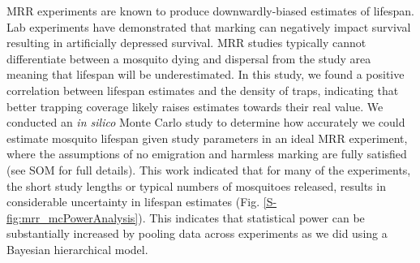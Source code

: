 \documentclass[]{article}
\begin{document}
MRR experiments are known to produce downwardly-biased estimates of
lifespan. Lab experiments have demonstrated that marking can negatively
impact survival \citep{verhulst2013advances,dickens2014effects}
resulting in artificially depressed survival. MRR studies typically
cannot differentiate between a mosquito dying and dispersal from the
study area meaning that lifespan will be underestimated. In this study,
we found a positive correlation between lifespan estimates and the
density of traps, indicating that better trapping coverage likely raises
estimates towards their real value. We conducted an \emph{in silico}
Monte Carlo study to determine how accurately we could estimate mosquito
lifespan given study parameters in an ideal MRR experiment, where the
assumptions of no emigration and harmless marking are fully satisfied
(see SOM for full details). This work indicated that for many of the
experiments, the short study lengths or typical numbers of mosquitoes
released, results in considerable uncertainty in lifespan estimates (Fig.
\ref{S-fig:mrr_mcPowerAnalysis}). This indicates that statistical power can be substantially
increased by pooling data across experiments as we did using a Bayesian
hierarchical model.
\end{document}
